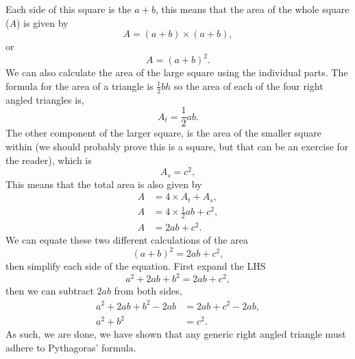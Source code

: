 \documentclass[a4paper,12pt]{article}
\begin{document}
Each side of this square is the $a + b$, this means that the
area of the whole square ($A$) is given by 
$$A = (a + b)\times(a + b),$$ 
or
$$A = (a + b)^2.$$ 
We can also calculate the area of the large square using 
the individual parts. The formula for the area of a triangle
is $\frac{1}{2}bh$ so the area of each of the four right
angled triangles is,
$$A_t = \frac{1}{2}ab.$$
The other component of the larger square, is the area of 
the smaller square within (we should probably prove this
is a square, but that can be an exercise for the reader), which is
$$A_s = c^2,$$
This means that the total area is also given by
\begin{align*}
A &= 4\times A_t + A_s, \\
A &= 4\times\frac{1}{2}ab + c^2, \\
A &= 2ab + c^2.
\end{align*}
We can equate these two different calculations of the area
$$(a + b)^2 = 2ab + c^2,$$
then simplify each side of the equation. First expand the LHS
$$a^2 + 2ab + b^2 = 2ab + c^2,$$
then we can subtract $2ab$ from both sides,
\begin{align*}
a^2 + 2ab + b^2 - 2ab &= 2ab + c^2 - 2ab, \\
a^2 + b^2 &= c^2.
\end{align*}
As such, we are done, we have shown that any generic right angled
triangle must adhere to Pythagoras' formula.
\end{document}
